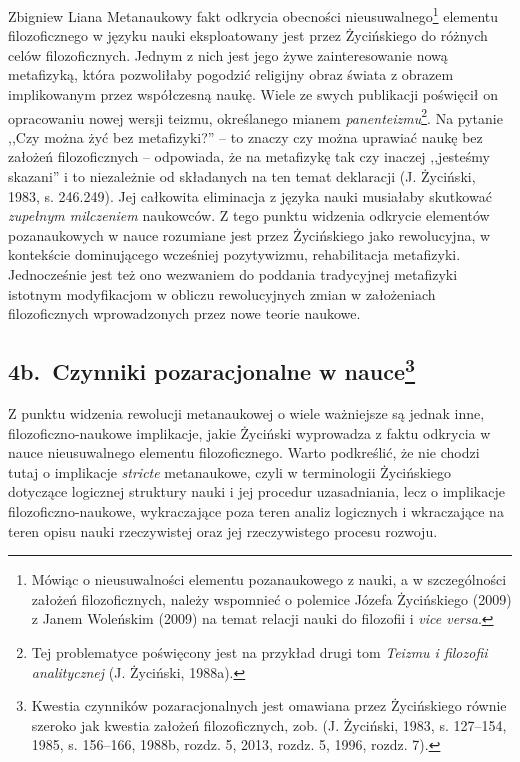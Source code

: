 \begin{artplenv}{Zbigniew Liana}
Metanaukowy fakt odkrycia obecności nieusuwalnego\footnote{Mówiąc o nieusuwalności elementu pozanaukowego z nauki, a w
	szczególności założeń filozoficznych, należy wspomnieć o polemice Józefa Życińskiego \label{ref:RND1yIXITCd0q}(2009) z
	Janem Woleńskim \label{ref:RNDgHTjy4YLsK}(2009) na temat relacji nauki do filozofii i \textit{vice versa}.} elementu
filozoficznego w języku nauki eksploatowany jest przez Życińskiego do różnych celów filozoficznych. Jednym z nich jest
jego żywe zainteresowanie nową metafizyką, która pozwoliłaby pogodzić religijny obraz świata z obrazem implikowanym
przez współczesną naukę. Wiele ze swych publikacji poświęcił on opracowaniu nowej wersji teizmu, określanego mianem
\textit{panenteizmu}\footnote{Tej problematyce poświęcony jest na przykład drugi tom \textit{Teizmu i filozofii
		analitycznej} \label{ref:RNDIkjJ8iRdco}(J. Życiński, 1988a).}. Na pytanie ,,Czy można żyć bez metafizyki?'' -- to znaczy
czy można uprawiać naukę bez założeń filozoficznych -- odpowiada, że na metafizykę tak czy inaczej ,,jesteśmy skazani'' i
to niezależnie od składanych na ten temat deklaracji \label{ref:RNDBwmyHW0qHJ}(J. Życiński, 1983, s. 246.249). Jej
całkowita eliminacja z języka nauki musiałaby skutkować \textit{zupełnym milczeniem} naukowców. Z tego punktu widzenia
odkrycie elementów pozanaukowych w nauce rozumiane jest przez Życińskiego jako rewolucyjna, w kontekście dominującego
wcześniej pozytywizmu, rehabilitacja metafizyki. Jednocześnie jest też ono wezwaniem do poddania tradycyjnej metafizyki
istotnym modyfikacjom w obliczu rewolucyjnych zmian w założeniach filozoficznych wprowadzonych przez nowe teorie
naukowe. 

\subsection{4b.~Czynniki pozaracjonalne w nauce\footnote{Kwestia czynników pozaracjonalnych jest omawiana przez Życińskiego równie
	szeroko jak kwestia założeń filozoficznych, zob. \label{ref:RND5w30wnfua2}(J. Życiński, 1983, s. 127–154, 1985, s.
	156–166, 1988b, rozdz. 5, 2013, rozdz. 5, 1996, rozdz. 7).}}

Z punktu widzenia rewolucji metanaukowej o wiele ważniejsze są jednak inne, filozoficzno-naukowe implikacje, jakie
Życiński wyprowadza z faktu odkrycia w nauce nieusuwalnego elementu filozoficznego. Warto podkreślić, że nie chodzi
tutaj o implikacje \textit{stricte} metanaukowe, czyli w terminologii Życińskiego dotyczące logicznej struktury nauki i
jej procedur uzasadniania, lecz o implikacje filozoficzno-naukowe, wykraczające poza teren analiz logicznych i
wkraczające na teren opisu nauki rzeczywistej oraz jej rzeczywistego procesu rozwoju. 


\end{artplenv}
